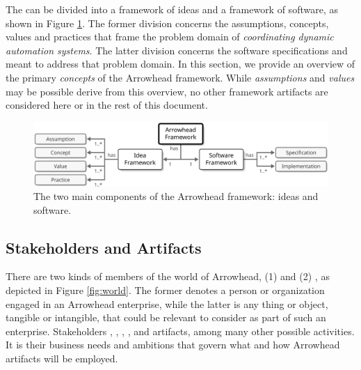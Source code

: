 %
%

The  can be divided into a framework of ideas and a framework of software, as shown in Figure \ref{fig:framework}.
The former division concerns the assumptions, concepts, values and practices that frame the problem domain of \textit{coordinating dynamic automation systems}.
The latter division concerns the software specifications and  meant to address that problem domain.
In this section, we provide an overview of the primary \textit{concepts} of the Arrowhead framework.
While \textit{assumptions} and \textit{values} may be possible derive from this overview, no other framework artifacts are considered here or in the rest of this document.

\vfill

\begin{figure}[ht!]
  \centering
  \includegraphics[scale=0.9]{figures/framework}
  \caption{
    The two main components of the Arrowhead framework: ideas and software.
  }
  \label{fig:framework}
\end{figure}

\vspace*{-3mm}

\subsection{Stakeholders and Artifacts}

There are two kinds of members of the world of Arrowhead, (1)  and (2) , as depicted in Figure \ref{fig:world}.
The former denotes a person or organization engaged in an Arrowhead enterprise, while the latter is any thing or object, tangible or intangible, that could be relevant to consider as part of such an enterprise.
Stakeholders , , , , and  artifacts, among many other possible activities.
It is their business needs and ambitions that govern what and how Arrowhead artifacts will be employed.

